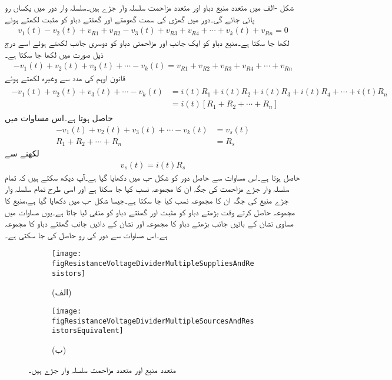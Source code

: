 شکل -الف میں متعدد منبع دباو اور متعدد مزاحمت سلسلہ وار جڑے ہیں۔سلسلہ وار دور میں یکساں رو  پائی جائے گی۔دور میں گھڑی کی سمت گھومتے اور گھٹتے دباو کو مثبت لکھتے ہوئے
\begin{align}
v_1(t)-v_2(t)+v_{R1}+v_{R2}-v_3(t)+v_{R3}+v_{R4}+\cdots+v_k(t)+v_{Rn}=0
\end{align}
لکھا جا سکتا ہے۔منبع دباو کو ایک جانب اور مزاحمتی دباو کو دوسری جانب لکھتے ہوئے اسے درج ذیل صورت میں لکھا جا سکتا ہے۔
\begin{align}
-v_1(t)+v_2(t)+v_3(t)+\cdots-v_k(t)=v_{R1}+v_{R2}+v_{R3}+v_{R4}+\cdots+v_{Rn}
\end{align}
قانون اوہم کی مدد سے  وغیرہ لکھتے ہوئے 
\begin{gather}
\begin{aligned}
-v_1(t)+v_2(t)+v_3(t)+\cdots-v_k(t)&=i(t) R_1+i(t) R_2+i(t) R_3+i(t) R_4+\cdots+i(t) R_n\\
&=i(t)\left[R_1+R_2+\cdots +R_n \right]
\end{aligned}
\end{gather}
حاصل ہوتا ہے۔اس مساوات میں 
\begin{align}
-v_1(t)+v_2(t)+v_3(t)+\cdots-v_k(t)&=v_s(t)\\
R_1+R_2+\cdots +R_n&=R_s
\end{align}
لکھنے سے
\begin{align}\label{مساوات_مزاحمتی_سلسلہ_وار_متعدد_مزاحمت_منبع_مساوی}
v_s(t)=i(t) R_s
\end{align}
حاصل ہوتا ہے۔اس مساوات سے حاصل دور کو شکل -ب میں دکھایا گیا ہے۔آپ دیکھ سکتے ہیں کہ تمام سلسلہ وار جڑے مزاحمت کی جگہ ان کا مجموعہ نسب کیا جا سکتا ہے اور اسی طرح تمام سلسلہ وار جڑے منبع کی جگہ ان کا مجموعہ نسب کیا جا سکتا ہے۔جیسا شکل -ب میں دکھایا گیا ہے،منبع کا مجموعہ حاصل کرتے وقت بڑھتے دباو کو مثبت اور گھٹتے دباو کو منفی لیا جاتا ہے۔یوں مساوات  میں مساوی نشان  کے بائیں جانب بڑھتے دباو کا مجموعہ اور نشان کے دائیں جانب گھٹتے دباو کا مجموعہ ہے۔اس مساوات سے دور کی رو  حاصل کی جا سکتی ہے۔
\begin{figure}
\centering
\begin{subfigure}{\textwidth}
\centering
\texttt{[image: figResistanceVoltageDividerMultipleSuppliesAndResistors]}
\caption*{(الف)}
\end{subfigure}
%
\begin{subfigure}{\textwidth}
\centering
\texttt{[image: figResistanceVoltageDividerMultipleSourcesAndResistorsEquivalent]}
\caption*{(ب)}
\end{subfigure}
\caption{متعدد منبع اور متعدد مزاحمت سلسلہ وار جڑے ہیں۔}
\label{شکل_مزاحمتی_متعدد_سلسلہ_وار_دور}
\end{figure}

